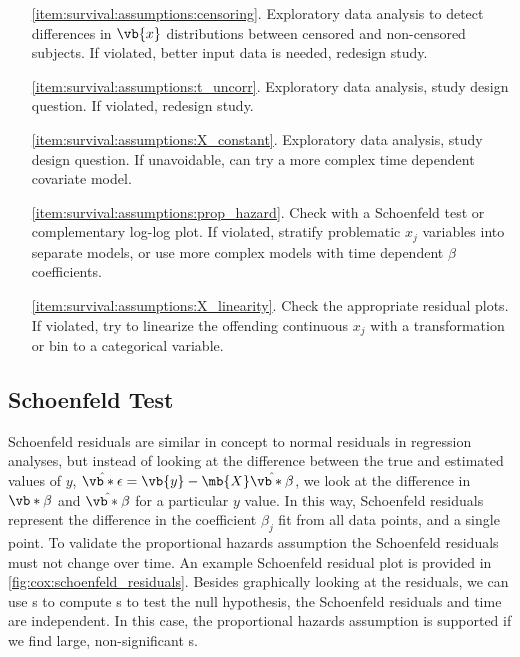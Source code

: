 \begin{itemize}[noitemsep]
  \item[\cref{item:survival:assumptions:censoring}.] Exploratory data analysis to detect differences in $\vb{x}$ distributions between censored and non-censored subjects. If violated, better input data is needed, redesign study.

  \item[\cref{item:survival:assumptions:t_uncorr}.] Exploratory data analysis, study design question. If violated, redesign study.

  \item[\cref{item:survival:assumptions:X_constant}.] Exploratory data analysis, study design question. If unavoidable, can try a more complex time dependent covariate model.

  \item[\cref{item:survival:assumptions:prop_hazard}.] Check with a Schoenfeld test or complementary log-log plot. If violated, stratify problematic $x_{j}$ variables into separate models, or use more complex models with time dependent $\beta$ coefficients.

  \item[\cref{item:survival:assumptions:X_linearity}.] Check the appropriate residual plots. If violated, try to linearize the offending continuous $x_{j}$ with a transformation or bin to a categorical variable.
\end{itemize}

\subsection{Schoenfeld Test}
\label{survival:assumptions:schoenfeld}

Schoenfeld residuals are similar in concept to normal residuals in regression analyses,
but instead of looking at the difference between the true and estimated values of $y$,
$\hat{\vb*{\epsilon}} = \vb{y} - \mb{X} \hat{\vb*{\beta}}$,
we look at the difference in $\vb*{\beta}$ and $\hat{\vb*{\beta}}$ for a particular $y$ value.
In this way, Schoenfeld residuals represent the difference in the
coefficient $\beta_{j}$ fit from all data points, and a single point.
To validate the proportional hazards assumption
the Schoenfeld residuals \cite{schoenfeld} must not change over time.
An example Schoenfeld residual plot is provided in
\cref{fig:cox:schoenfeld_residuals}.
Besides graphically looking at the residuals,
we can use {\chiSqtest}s to compute {\pvalue}s
to test the null hypothesis, \ie the Schoenfeld residuals and time are independent.
In this case, the proportional hazards assumption is supported
if we find large, non-significant {\pvalue}s.

